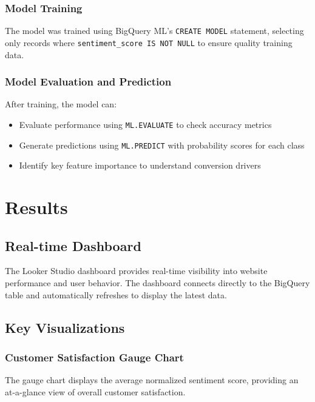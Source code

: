 \documentclass[12pt,a4paper]{article}
\begin{document}
\subsubsection{Model Training}

The model was trained using BigQuery ML's \texttt{CREATE MODEL} statement, selecting only records where \texttt{sentiment\_score IS NOT NULL} to ensure quality training data.

\subsubsection{Model Evaluation and Prediction}

After training, the model can:
\begin{itemize}
    \item Evaluate performance using \texttt{ML.EVALUATE} to check accuracy metrics
    \item Generate predictions using \texttt{ML.PREDICT} with probability scores for each class
    \item Identify key feature importance to understand conversion drivers
\end{itemize}

\section{Results}

\subsection{Real-time Dashboard}

The Looker Studio dashboard provides real-time visibility into website performance and user behavior. The dashboard connects directly to the BigQuery table and automatically refreshes to display the latest data.

\subsection{Key Visualizations}

\subsubsection{Customer Satisfaction Gauge Chart}

The gauge chart displays the average normalized sentiment score, providing an at-a-glance view of overall customer satisfaction.
\end{document}
